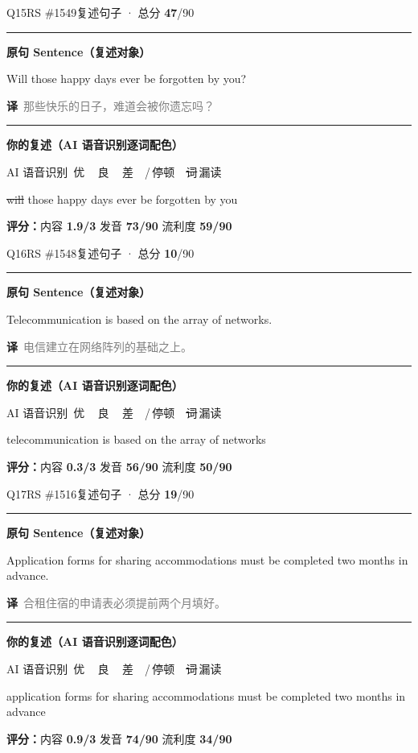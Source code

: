 \documentclass[11pt]{article}
\newcommand{\sfull}[1]{\textcolor{cFix}{\bfseries #1}}     %
\newcommand{\spart}[1]{\textcolor{cPartial}{\bfseries #1}} %
\newcommand{\szero}[1]{\textcolor{cWrong}{\bfseries #1}}   %
\newcommand{\ptesub}[1]{%
  \par\needspace{2\baselineskip}\smallskip
  {\color{cAccent}\rule[-0.2ex]{3pt}{1.05em}}\hspace{6pt}%
  {\bfseries\color{cHead}#1}\par\nopagebreak\smallskip}
\newcommand{\sg}[1]{\textcolor{cSpkGood}{#1}}   %
\newcommand{\sr}[1]{\textcolor{cSpkBad}{#1}}    %
\newcommand{\smiss}[1]{\textcolor{cSpkBad}{\sout{#1}}}  %
\newcommand{\asrlegend}{{\footnotesize\color{gray}AI 语音识别\quad
  {\color{cSpkGood}\textbullet}\,优\ \ {\color{cSpkOk}\textbullet}\,良\ \
  {\color{cSpkBad}\textbullet}\,差\ \ {\color{gray}/}\,停顿\ \
  {\color{cSpkBad}\sout{词}}\,漏读}}
\newcommand{\zh}[1]{{\footnotesize\textcolor{cNote}{\textbf{译}}\ \textcolor{gray}{#1}}}
\begin{document}
\begin{qblock}{Q15\quad RS \#1549}{复述句子 · 总分 \textcolor{cAccent}{\bfseries 47}/90}
\ptesub{原句 Sentence（复述对象）}
\begin{promptbox}
Will those happy days ever be forgotten by you?
\end{promptbox}
\zh{那些快乐的日子，难道会被你遗忘吗？}
\ptesub{你的复述（AI 语音识别逐词配色）}
\asrlegend
\begin{asrbox}
\smiss{will} \sg{those} \sg{happy} \sg{days} \sg{ever} \sg{be} \sg{forgotten} \sg{by} \sg{you}
\end{asrbox}
\smallskip
{\small\textbf{评分：}内容 \spart{1.9/3} \quad\textperiodcentered\quad 发音 \sfull{73/90} \quad\textperiodcentered\quad 流利度 \spart{59/90}}
\end{qblock}

\begin{qblock}{Q16\quad RS \#1548}{复述句子 · 总分 \textcolor{cAccent}{\bfseries 10}/90}
\ptesub{原句 Sentence（复述对象）}
\begin{promptbox}
Telecommunication is based on the array of networks.
\end{promptbox}
\zh{电信建立在网络阵列的基础之上。}
\ptesub{你的复述（AI 语音识别逐词配色）}
\asrlegend
\begin{asrbox}
\sr{telecommunication} \sg{is} \sg{based} \sg{on} \sg{the} \sg{array} \sg{of} \sg{networks}
\end{asrbox}
\smallskip
{\small\textbf{评分：}内容 \szero{0.3/3} \quad\textperiodcentered\quad 发音 \spart{56/90} \quad\textperiodcentered\quad 流利度 \spart{50/90}}
\end{qblock}

\begin{qblock}{Q17\quad RS \#1516}{复述句子 · 总分 \textcolor{cAccent}{\bfseries 19}/90}
\ptesub{原句 Sentence（复述对象）}
\begin{promptbox}
Application forms for sharing accommodations must be completed two months in advance.
\end{promptbox}
\zh{合租住宿的申请表必须提前两个月填好。}
\ptesub{你的复述（AI 语音识别逐词配色）}
\asrlegend
\begin{asrbox}
\sr{application} \sg{forms} \sg{for} \sg{sharing} \sg{accommodations} \sg{must} \sg{be} \sg{completed} \sr{two} \sg{months} \sg{in} \sg{advance}
\end{asrbox}
\smallskip
{\small\textbf{评分：}内容 \spart{0.9/3} \quad\textperiodcentered\quad 发音 \sfull{74/90} \quad\textperiodcentered\quad 流利度 \spart{34/90}}\quad{\footnotesize\color{gray}（录音 0:10）}
\end{qblock}
\end{document}
